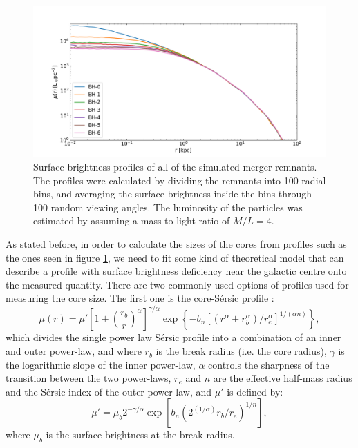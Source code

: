 \documentclass[english, oneside]{HYgradu}
\begin{document}
\begin{figure}[h]
	\centering
	\includegraphics[width=\textwidth]{SurfaceBrightnessProfiles.png}
	\caption{Surface brightness profiles of all of the simulated merger remnants. The profiles were calculated by dividing the remnants into 100 radial bins, and averaging the surface brightness inside the bins through 100 random viewing angles. The luminosity of the particles was estimated by assuming a mass-to-light ratio of $M/L = 4$.}
	\label{figure:surface_brightness}
\end{figure}

As stated before, in order to calculate the sizes of the cores from profiles such as the ones seen in figure \ref{figure:surface_brightness}, we need to fit some kind of theoretical model that can describe a profile with surface brightness deficiency near the galactic centre onto the measured quantity. There are two commonly used options of profiles used for measuring the core size. The first one is the core-Sérsic profile \citep{Graham2003}:
\begin{equation}
\mu(r) = \mu' \left[ 1 + \left( \frac{r_b}{r} \right)^\alpha \right]^{\gamma / \alpha} \exp \left\lbrace -b_n \left[ \left( r^\alpha + r_b^\alpha \right) / r_e^\alpha \right]^{1/(\alpha n)} \right\rbrace, \label{eq:core-sersic}
\end{equation}
which divides the single power law Sérsic profile into a combination of an inner and outer power-law, and where $r_b$ is the break radius (i.e. the core radius), $\gamma$ is the logarithmic slope of the inner power-law, $\alpha$ controls the sharpness of the transition between the two power-laws, $r_e$ and $n$ are the effective half-mass radius and the Sérsic index of the outer power-law, and $\mu'$ is defined by:
\begin{equation}
\mu' = \mu_b 2^{-\gamma/\alpha} \exp \left[ b_n \left( 2^(1/\alpha) r_b/r_e \right)^{1/n} \right], 
\label{eq:mu_dot}
\end{equation}
where $\mu_b$ is the surface brightness at the break radius. 
\end{document}
